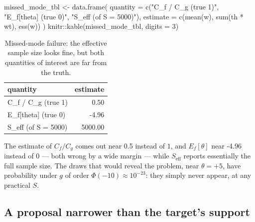\documentclass[
  letterpaper,
  DIV=11,
  numbers=noendperiod]{scrreprt}
\newenvironment{Shaded}{\begin{snugshade}}{\end{snugshade}}
\newcommand{\AttributeTok}[1]{\textcolor[rgb]{0.40,0.45,0.13}{#1}}
\newcommand{\DecValTok}[1]{\textcolor[rgb]{0.68,0.00,0.00}{#1}}
\newcommand{\FunctionTok}[1]{\textcolor[rgb]{0.28,0.35,0.67}{#1}}
\newcommand{\NormalTok}[1]{\textcolor[rgb]{0.00,0.23,0.31}{#1}}
\newcommand{\OtherTok}[1]{\textcolor[rgb]{0.00,0.23,0.31}{#1}}
\newcommand{\SpecialCharTok}[1]{\textcolor[rgb]{0.37,0.37,0.37}{#1}}
\newcommand{\StringTok}[1]{\textcolor[rgb]{0.13,0.47,0.30}{#1}}
\begin{document}
\begin{Shaded}
\begin{Highlighting}[]
\NormalTok{missed\_mode\_tbl }\OtherTok{\textless{}{-}} \FunctionTok{data.frame}\NormalTok{(}
    \AttributeTok{quantity =} \FunctionTok{c}\NormalTok{(}\StringTok{"C\_f / C\_g (true 1)"}\NormalTok{, }\StringTok{"E\_f[theta] (true 0)"}\NormalTok{, }\StringTok{"S\_eff (of S = 5000)"}\NormalTok{),}
    \AttributeTok{estimate =} \FunctionTok{c}\NormalTok{(}\FunctionTok{mean}\NormalTok{(w), }\FunctionTok{sum}\NormalTok{(th }\SpecialCharTok{*}\NormalTok{ wt), }\FunctionTok{ess}\NormalTok{(w))}
\NormalTok{)}
\NormalTok{knitr}\SpecialCharTok{::}\FunctionTok{kable}\NormalTok{(missed\_mode\_tbl, }\AttributeTok{digits =} \DecValTok{3}\NormalTok{)}
\end{Highlighting}
\end{Shaded}

{

\begin{longtable}[]{@{}lr@{}}

\caption{\label{tbl-missed-mode}Missed-mode failure: the effective
sample size looks fine, but both quantities of interest are far from the
truth.}

\tabularnewline

\toprule\noalign{}
quantity & estimate \\
\midrule\noalign{}
\endhead
\bottomrule\noalign{}
\endlastfoot
C\_f / C\_g (true 1) & 0.50 \\
E\_f{[}theta{]} (true 0) & -4.96 \\
S\_eff (of S = 5000) & 5000.00 \\

\end{longtable}

}

The estimate of \(C_f/C_g\) comes out near 0.5 instead of \(1\), and
\(E_f[\theta]\) near -4.96 instead of \(0\) --- both wrong by a wide
margin --- while \(S_{\text{eff}}\) reports essentially the full sample
size. The draws that would reveal the problem, near \(\theta=+5\), have
probability under \(g\) of order \(\Phi(-10) \approx 10^{-23}\): they
simply never appear, at any practical \(S\).

\subsection{A proposal narrower than the target's
support}\label{a-proposal-narrower-than-the-targets-support}
\end{document}
